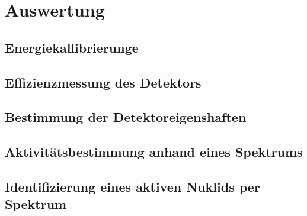 \newpage
\section{Auswertung}

\label{sec:Auswertung}

\subsection{Energiekallibrierunge}

\subsection{Effizienzmessung des Detektors}

\subsection{Bestimmung der Detektoreigenshaften}

\subsection{Aktivitätsbestimmung anhand eines Spektrums}

\subsection{Identifizierung eines aktiven Nuklids per Spektrum}



